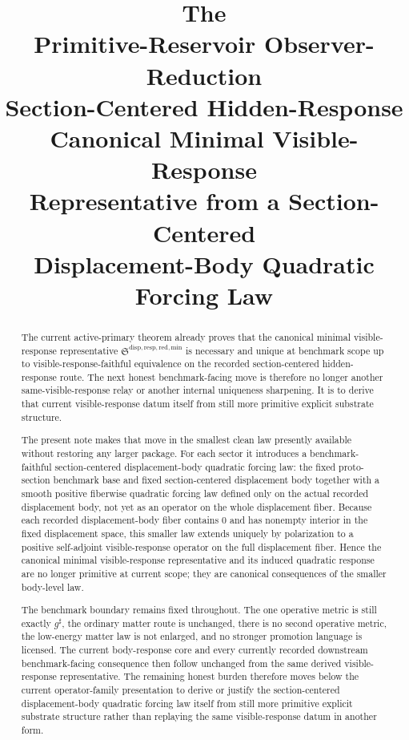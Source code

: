 \documentclass[11pt]{article}
\title{\textbf{The \TheoryName{}}\\[0.4em]
\large Primitive-Reservoir Observer-Reduction\\
\large Section-Centered Hidden-Response\\
\large Canonical Minimal Visible-Response\\
\large Representative from a Section-Centered\\
\large Displacement-Body Quadratic Forcing Law}
\author{}
\date{}
\newcommand{\CompletedMetric}{g^{\sharp}}
\newcommand{\MinimalReducedStructure}{\mathfrak S^{\mathrm{disp,resp,red,min}}}
\begin{document}
\maketitle

\begin{abstract}
The current active-primary theorem already proves that the canonical minimal visible-response representative \(\MinimalReducedStructure\) is necessary and unique at benchmark scope up to visible-response-faithful equivalence on the recorded section-centered hidden-response route. The next honest benchmark-facing move is therefore no longer another same-visible-response relay or another internal uniqueness sharpening. It is to derive that current visible-response datum itself from still more primitive explicit substrate structure.

The present note makes that move in the smallest clean law presently available without restoring any larger package. For each sector it introduces a benchmark-faithful section-centered displacement-body quadratic forcing law: the fixed proto-section benchmark base and fixed section-centered displacement body together with a smooth positive fiberwise quadratic forcing law defined only on the actual recorded displacement body, not yet as an operator on the whole displacement fiber. Because each recorded displacement-body fiber contains \(0\) and has nonempty interior in the fixed displacement space, this smaller law extends uniquely by polarization to a positive self-adjoint visible-response operator on the full displacement fiber. Hence the canonical minimal visible-response representative and its induced quadratic response are no longer primitive at current scope; they are canonical consequences of the smaller body-level law.

The benchmark boundary remains fixed throughout. The one operative metric is still exactly \(\CompletedMetric\), the ordinary matter route is unchanged, there is no second operative metric, the low-energy matter law is not enlarged, and no stronger promotion language is licensed. The current body-response core and every currently recorded downstream benchmark-facing consequence then follow unchanged from the same derived visible-response representative. The remaining honest burden therefore moves below the current operator-family presentation to derive or justify the section-centered displacement-body quadratic forcing law itself from still more primitive explicit substrate structure rather than replaying the same visible-response datum in another form.
\end{abstract}
\end{document}
